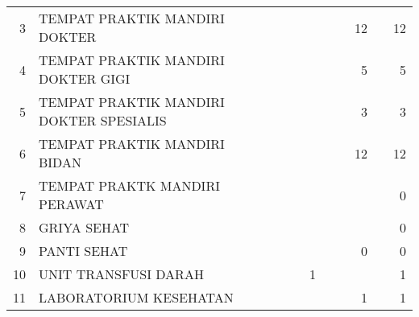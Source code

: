 {\begin{small}
\begin{tabular}{rY{22em}rrrrrrrr}
    3 & TEMPAT PRAKTIK MANDIRI DOKTER   & & & & & & 12 & & 12 \\
    4 & TEMPAT PRAKTIK MANDIRI DOKTER GIGI & & & & & & 5 & & 5 \\
    5 & TEMPAT PRAKTIK MANDIRI DOKTER SPESIALIS & & & & & & 3 & & 3 \\
    6 & TEMPAT PRAKTIK MANDIRI BIDAN & & & & & & 12 & & 12 \\
    7 & TEMPAT PRAKTK MANDIRI PERAWAT & & & & & & & & 0 \\
    8 & GRIYA SEHAT & & & & & & & & 0 \\
    9 & PANTI SEHAT & & & & & & 0 & & 0 \\
    10 & UNIT TRANSFUSI DARAH & & & 1 & & & & & 1 \\
    11 & LABORATORIUM KESEHATAN & & & & & & 1 & & 1 \\

\end{tabular}%


\end{small}}
